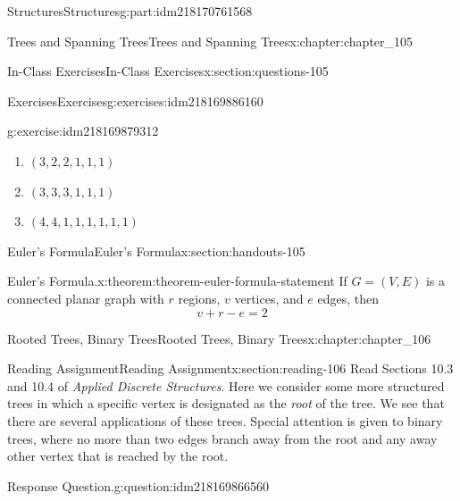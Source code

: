 \documentclass[oneside,10pt,]{book}
\numberwithin{equation}{section}
\begin{document}
\begin{partptx}{Structures}{}{Structures}{}{}{g:part:idm218170761568}
\begin{chapterptx}{Trees and Spanning Trees}{}{Trees and Spanning Trees}{}{}{x:chapter:chapter_105}
\begin{sectionptx}{In-Class Exercises}{}{In-Class Exercises}{}{}{x:section:questions-105}
\begin{exercises-subsection-numberless}{Exercises}{}{Exercises}{}{}{g:exercises:idm218169886160}
\begin{exercisegroup}
\begin{divisionexerciseeg}{5}{}{}{g:exercise:idm218169879312}
\begin{enumerate}[label=(\alph*)]
\item{}\(\displaystyle (3, 2, 2, 1, 1, 1)\)%
\item{}\(\displaystyle (3, 3, 3, 1, 1, 1)\)%
\item{}\(\displaystyle (4, 4, 1, 1, 1, 1, 1, 1)\)%
\end{enumerate}
%
\end{divisionexerciseeg}%
\end{exercisegroup}
\par\medskip\noindent
\end{exercises-subsection-numberless}
\end{sectionptx}
%
%
\typeout{************************************************}
\typeout{************************************************}
%
\begin{sectionptx}{Euler's Formula}{}{Euler's Formula}{}{}{x:section:handouts-105}
\begin{theorem}{Euler's Formula.}{}{x:theorem:theorem-euler-formula-statement}%
%
If \(G = (V, E)\) is a connected planar graph with \(r\) regions, \(v\) vertices, and \(e\) edges, then%
\begin{equation*}
v + r - e = 2
\end{equation*}
%
\end{theorem}
\end{sectionptx}
\end{chapterptx}
%
\typeout{************************************************}
\typeout{************************************************}
%
\begin{chapterptx}{Rooted Trees, Binary Trees}{}{Rooted Trees, Binary Trees}{}{}{x:chapter:chapter_106}
\index{}%
%
%
\typeout{************************************************}
\typeout{************************************************}
%
\begin{sectionptx}{Reading Assignment}{}{Reading Assignment}{}{}{x:section:reading-106}
Read Sections 10.3 and 10.4 of \emph{Applied Discrete Structures}. Here we consider some more structured trees in which a specific vertex is designated as the \emph{root} of the tree.  We see that there are several applications of these trees.  Special attention is given to binary trees, where no more than two edges branch away from the root and any away other vertex that is reached by the root.%
\begin{question}{Response Question.}{g:question:idm218169866560}%

\end{question}
\end{sectionptx}
\end{chapterptx}
\end{partptx}
\end{document}
